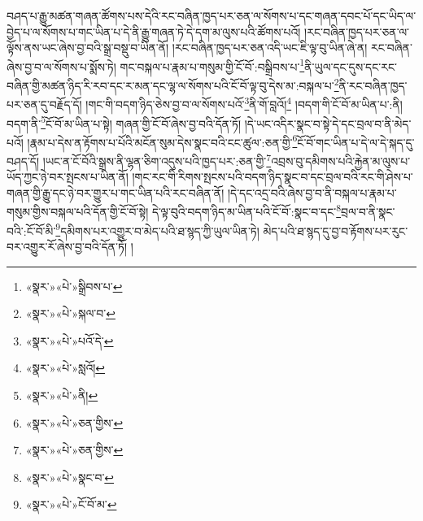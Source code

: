 བཤད་པ་རྒྱུ་མཚན་གཞན་ཚོགས་པས་དེའི་རང་བཞིན་ཁྱད་པར་ཅན་ལ་སོགས་པ་དང་གཞན་དབང་པོ་དང་ཡིད་ལ་བྱེད་པ་ལ་སོགས་པ་གང་ཡིན་པ་དེ་ནི་རྒྱུ་གཞན་ཏེ་དེ་དག་མ་ལུས་པའི་ཚོགས་པའོ། །རང་བཞིན་ཁྱད་པར་ཅན་ལ་ལྟོས་ནས་ཡང་ཞེས་བྱ་བའི་སྒྲ་བསྡུ་བ་ཡིན་ནོ། །རང་བཞིན་ཁྱད་པར་ཅན་འདི་ཡང་ཇི་ལྟ་བུ་ཡིན་ཞེ་ན། རང་བཞིན་ཞེས་བྱ་བ་ལ་སོགས་པ་སྨོས་ཏེ། གང་བསྐལ་པ་རྣམ་པ་གསུམ་གྱི་ངོ་བོ་:བསྒྲིབས་པ་\footnote{«སྣར་»«པེ་»སྒྲིབས་པ་}ནི་ཡུལ་དང་དུས་དང་རང་བཞིན་གྱི་མཚན་ཉིད་རི་རབ་དང་ར་མན་དང་ལྷ་ལ་སོགས་པའི་ངོ་བོ་ལྟ་བུ་དེས་མ་:བསྐལ་པ་\footnote{«སྣར་»«པེ་»སྐལ་བ་}ནི་རང་བཞིན་ཁྱད་པར་ཅན་དུ་བརྗོད་དོ། །གང་གི་བདག་ཉིད་ཅེས་བྱ་བ་ལ་སོགས་པའོ་\footnote{«སྣར་»«པེ་»པའོ་དེ་}ནི་གོ་བླའོ།\footnote{«སྣར་»«པེ་»སླའོ།} །བདག་གི་ངོ་བོ་མ་ཡིན་པ་:ནི།བདག་ནི་\footnote{«སྣར་»«པེ་»ནི།}ངོ་བོ་མ་ཡིན་པ་སྟེ། གཞན་གྱི་ངོ་བོ་ཞེས་བྱ་བའི་དོན་ཏོ། །དེ་ཡང་འདིར་སྣང་བ་སྟེ་དེ་དང་བྲལ་བ་ནི་མེད་པའོ། །རྣམ་པ་དེས་ན་རྟོགས་པ་པོའི་མངོན་སུམ་དེས་སྣང་བའི་ངང་ཚུལ་:ཅན་གྱི་\footnote{«སྣར་»«པེ་»ཅན་གྱིས་}ངོ་བོ་གང་ཡིན་པ་དེ་ལ་དེ་སྐད་དུ་བཤད་དོ། །ཡང་ན་ངོ་བོའི་སྒྲས་ནི་ལྷན་ཅིག་འདུས་པའི་ཁྱད་པར་:ཅན་གྱི་\footnote{«སྣར་»«པེ་»ཅན་གྱིས་}འབྲས་བུ་དམིགས་པའི་རྐྱེན་མ་ལུས་པ་ཡོད་ཀྱང་ཉེ་བར་སྤངས་པ་ཡིན་ནོ། །གང་རང་གི་རིགས་སྤངས་པའི་བདག་ཉིད་སྣང་བ་དང་བྲལ་བའི་རང་གི་ཤེས་པ་གཞན་གྱི་རྒྱུ་དང་ཉེ་བར་གྱུར་པ་གང་ཡིན་པའི་རང་བཞིན་ནོ། །དེ་དང་འདྲ་བའི་ཞེས་བྱ་བ་ནི་བསྐལ་པ་རྣམ་པ་གསུམ་གྱིས་བསྐལ་པའི་དོན་གྱི་ངོ་བོ་སྟེ། དེ་ལྟ་བུའི་བདག་ཉིད་མ་ཡིན་པའི་ངོ་བོ་:སྣང་བ་དང་\footnote{«སྣར་»«པེ་»སྣང་བ་}བྲལ་བ་ནི་སྣང་བའི་:ངོ་བོ་མི་\footnote{«སྣར་»«པེ་»ངོ་བོ་མ་}དམིགས་པར་འགྱུར་བ་མེད་པའི་ཐ་སྙད་ཀྱི་ཡུལ་ཡིན་ཏེ། མེད་པའི་ཐ་སྙད་དུ་བྱ་བ་རྟོགས་པར་རུང་བར་འགྱུར་རོ་ཞེས་བྱ་བའི་དོན་ཏོ། །
